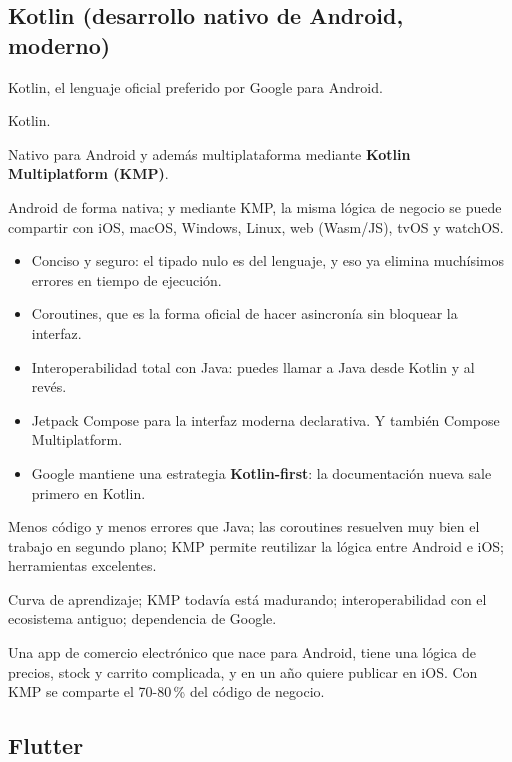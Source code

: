 \subsection{Kotlin (desarrollo nativo de Android, moderno)}

 Kotlin, el lenguaje oficial preferido por Google para Android.

 Kotlin.

 Nativo para Android y además multiplataforma mediante \textbf{Kotlin Multiplatform (KMP)}.

 Android de forma nativa; y mediante KMP, la misma lógica de negocio se puede compartir con iOS, macOS, Windows, Linux, web (Wasm/JS), tvOS y watchOS.

\begin{itemize}[leftmargin=*,itemsep=0.2em,topsep=0.2em]
  \item Conciso y seguro: el tipado nulo es del lenguaje, y eso ya elimina muchísimos errores en tiempo de ejecución.
  \item Coroutines, que es la forma oficial de hacer asincronía sin bloquear la interfaz.
  \item Interoperabilidad total con Java: puedes llamar a Java desde Kotlin y al revés.
  \item Jetpack Compose para la interfaz moderna declarativa. Y también Compose Multiplatform.
  \item Google mantiene una estrategia \textbf{Kotlin-first}: la documentación nueva sale primero en Kotlin.
\end{itemize}

 Menos código y menos errores que Java; las coroutines resuelven muy bien el trabajo en segundo plano; KMP permite reutilizar la lógica entre Android e iOS; herramientas excelentes.

 Curva de aprendizaje; KMP todavía está madurando; interoperabilidad con el ecosistema antiguo; dependencia de Google.

 Una app de comercio electrónico que nace para Android, tiene una lógica de precios, stock y carrito complicada, y en un año quiere publicar en iOS. Con KMP se comparte el 70-80\,\% del código de negocio.

\subsection{Flutter}

